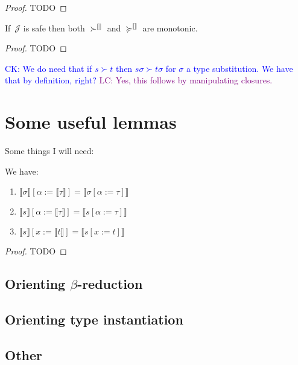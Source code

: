 \documentclass[runningheads,a4paper]{llncs}
\newcommand{\Termmap}{\mathcal{J}}
\newcommand{\succinterpret}{\succ^{\llbracket\rrbracket}}
\newcommand{\succeqinterpret}{\succeq^{\llbracket\rrbracket}}
\newcommand{\typeinterpret}[1]{\llbracket #1 \rrbracket}
\newcommand{\interpret}[1]{\llbracket #1 \rrbracket}
\newcommand{\CK}[1]{\textcolor{blue}{CK: #1}}
\newcommand{\LC}[1]{\textcolor{purple}{LC: #1}}
\begin{document}
\begin{proof}
  TODO
\end{proof}

\begin{lemma}
  If~$\Termmap$ is safe then both $\succinterpret$ and
  $\succeqinterpret$ are monotonic.
\end{lemma}

\begin{proof}
  TODO
\end{proof}

\CK{We do need that if $s \succ t$ then $s\sigma \succ t\sigma$ for
  $\sigma$ a type substitution.  We have that by definition, right?}
\LC{Yes, this follows by manipulating closures.}

\section{Some useful lemmas}

Some things I will need:

\begin{lemma}\label{lem:substitutioninterpret}
We have:
\begin{enumerate}
\item\label{lem:substitutioninterpret:types}
  $\typeinterpret{\sigma}[\alpha:=\typeinterpret{\tau}] =
  \typeinterpret{\sigma[\alpha:=\tau]}$
\item\label{lem:substitutioninterpret:mixed}
  $\interpret{s}[\alpha:=\typeinterpret{\tau}] =
  \interpret{s[\alpha:=\tau]}$
\item\label{lem:substitutioninterpret:terms}
  $\interpret{s}[x:=\interpret{t}] = \interpret{s[x:=t]}$
\end{enumerate}
\end{lemma}

\begin{proof}
TODO
\end{proof}

\subsection{Orienting $\beta$-reduction}

\subsection{Orienting type instantiation}

\subsection{Other}
\end{document}
